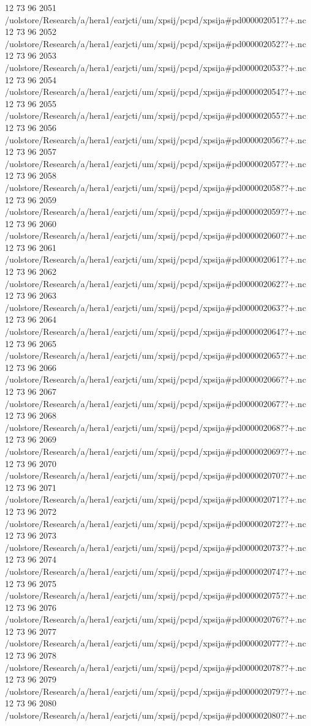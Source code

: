 12 73 96
2051
/uolstore/Research/a/hera1/earjcti/um/xpsij/pcpd/xpsija#pd000002051??+.nc
12 73 96
2052
/uolstore/Research/a/hera1/earjcti/um/xpsij/pcpd/xpsija#pd000002052??+.nc
12 73 96
2053
/uolstore/Research/a/hera1/earjcti/um/xpsij/pcpd/xpsija#pd000002053??+.nc
12 73 96
2054
/uolstore/Research/a/hera1/earjcti/um/xpsij/pcpd/xpsija#pd000002054??+.nc
12 73 96
2055
/uolstore/Research/a/hera1/earjcti/um/xpsij/pcpd/xpsija#pd000002055??+.nc
12 73 96
2056
/uolstore/Research/a/hera1/earjcti/um/xpsij/pcpd/xpsija#pd000002056??+.nc
12 73 96
2057
/uolstore/Research/a/hera1/earjcti/um/xpsij/pcpd/xpsija#pd000002057??+.nc
12 73 96
2058
/uolstore/Research/a/hera1/earjcti/um/xpsij/pcpd/xpsija#pd000002058??+.nc
12 73 96
2059
/uolstore/Research/a/hera1/earjcti/um/xpsij/pcpd/xpsija#pd000002059??+.nc
12 73 96
2060
/uolstore/Research/a/hera1/earjcti/um/xpsij/pcpd/xpsija#pd000002060??+.nc
12 73 96
2061
/uolstore/Research/a/hera1/earjcti/um/xpsij/pcpd/xpsija#pd000002061??+.nc
12 73 96
2062
/uolstore/Research/a/hera1/earjcti/um/xpsij/pcpd/xpsija#pd000002062??+.nc
12 73 96
2063
/uolstore/Research/a/hera1/earjcti/um/xpsij/pcpd/xpsija#pd000002063??+.nc
12 73 96
2064
/uolstore/Research/a/hera1/earjcti/um/xpsij/pcpd/xpsija#pd000002064??+.nc
12 73 96
2065
/uolstore/Research/a/hera1/earjcti/um/xpsij/pcpd/xpsija#pd000002065??+.nc
12 73 96
2066
/uolstore/Research/a/hera1/earjcti/um/xpsij/pcpd/xpsija#pd000002066??+.nc
12 73 96
2067
/uolstore/Research/a/hera1/earjcti/um/xpsij/pcpd/xpsija#pd000002067??+.nc
12 73 96
2068
/uolstore/Research/a/hera1/earjcti/um/xpsij/pcpd/xpsija#pd000002068??+.nc
12 73 96
2069
/uolstore/Research/a/hera1/earjcti/um/xpsij/pcpd/xpsija#pd000002069??+.nc
12 73 96
2070
/uolstore/Research/a/hera1/earjcti/um/xpsij/pcpd/xpsija#pd000002070??+.nc
12 73 96
2071
/uolstore/Research/a/hera1/earjcti/um/xpsij/pcpd/xpsija#pd000002071??+.nc
12 73 96
2072
/uolstore/Research/a/hera1/earjcti/um/xpsij/pcpd/xpsija#pd000002072??+.nc
12 73 96
2073
/uolstore/Research/a/hera1/earjcti/um/xpsij/pcpd/xpsija#pd000002073??+.nc
12 73 96
2074
/uolstore/Research/a/hera1/earjcti/um/xpsij/pcpd/xpsija#pd000002074??+.nc
12 73 96
2075
/uolstore/Research/a/hera1/earjcti/um/xpsij/pcpd/xpsija#pd000002075??+.nc
12 73 96
2076
/uolstore/Research/a/hera1/earjcti/um/xpsij/pcpd/xpsija#pd000002076??+.nc
12 73 96
2077
/uolstore/Research/a/hera1/earjcti/um/xpsij/pcpd/xpsija#pd000002077??+.nc
12 73 96
2078
/uolstore/Research/a/hera1/earjcti/um/xpsij/pcpd/xpsija#pd000002078??+.nc
12 73 96
2079
/uolstore/Research/a/hera1/earjcti/um/xpsij/pcpd/xpsija#pd000002079??+.nc
12 73 96
2080
/uolstore/Research/a/hera1/earjcti/um/xpsij/pcpd/xpsija#pd000002080??+.nc
